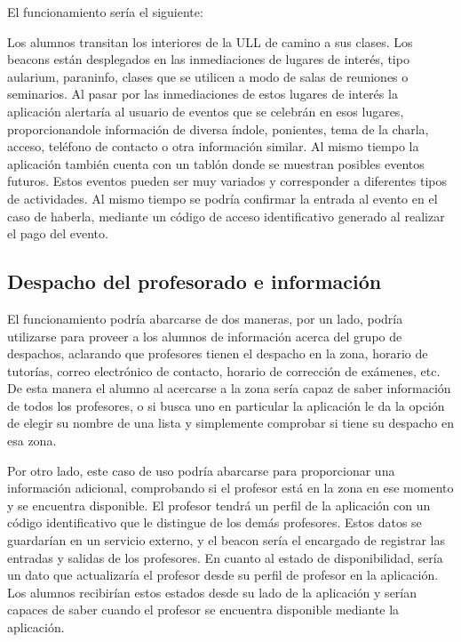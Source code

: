 El funcionamiento sería el siguiente: 

Los alumnos transitan los interiores de la ULL de camino a sus clases. Los beacons están desplegados en las inmediaciones de lugares de interés, tipo aularium, paraninfo, clases que se utilicen a modo de salas de reuniones o seminarios. Al pasar por las inmediaciones de estos lugares de interés la aplicación alertaría al usuario de eventos que se celebrán en esos lugares, proporcionandole información de diversa índole, ponientes, tema de la charla, acceso, teléfono de contacto o otra información similar.  Al mismo tiempo la aplicación también cuenta con un tablón donde se muestran posibles eventos futuros. Estos eventos pueden ser muy variados y corresponder a diferentes tipos de actividades. Al mismo tiempo se podría confirmar la entrada al evento en el caso de haberla, mediante un código de acceso identificativo generado al realizar el pago del evento.

\subsection{Despacho del profesorado e información}

El funcionamiento podría abarcarse de dos maneras, por un lado, podría utilizarse para proveer a los alumnos de información acerca del grupo de despachos, aclarando que profesores tienen el despacho en la zona, horario de tutorías, correo electrónico de contacto, horario de corrección de exámenes, etc. De esta manera el alumno al acercarse a la zona sería capaz de saber información de todos los profesores, o si busca uno en particular la aplicación le da la opción de elegir su nombre de una lista y simplemente comprobar si tiene su despacho en esa zona. 

Por otro lado, este caso de uso podría abarcarse para proporcionar una información adicional, comprobando si el profesor está en la zona en ese momento y se encuentra disponible. El profesor tendrá un perfil de la aplicación con un código identificativo que le distingue de los demás profesores. Estos datos se guardarían en un servicio externo, y el beacon sería el encargado de registrar las entradas y salidas de los profesores. En cuanto al estado de disponibilidad, sería un dato que actualizaría el profesor desde su perfil de profesor en la aplicación. Los alumnos recibirían estos estados desde su lado de la aplicación y serían capaces de saber cuando el profesor se encuentra disponible mediante la aplicación. 

